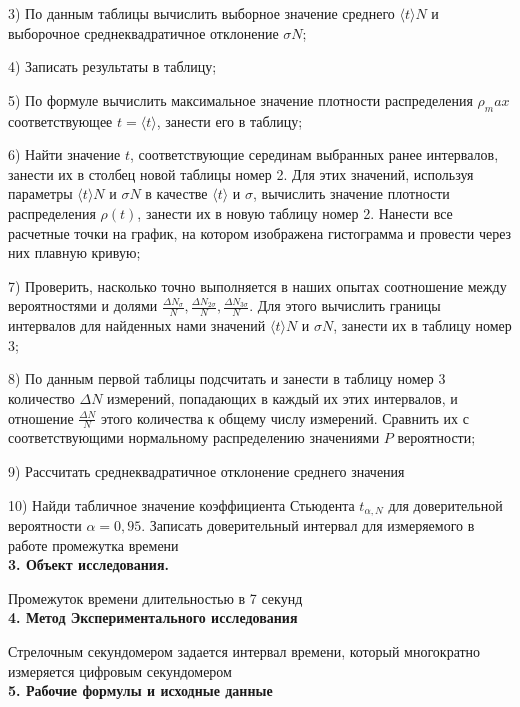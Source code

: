 \documentclass[14pt]{article}
\begin{document}
	\par 3) По данным таблицы вычислить выборное значение среднего $\langle t \rangle N$ и выборочное среднеквадратичное отклонение $\sigma N$;
	\par 4) Записать результаты в таблицу;
	\par 5) По формуле вычислить максимальное значение плотности распределения $\rho_max$ соответствующее $t=\langle t \rangle$, занести его в таблицу;
	\par 6) Найти значение $t$, соответствующие серединам выбранных ранее интервалов, занести их в столбец новой таблицы номер 2. Для этих значений, используя параметры $\langle t \rangle N$ и $\sigma N$ в качестве $\langle t \rangle$ и $\sigma$, вычислить значение плотности распределения $\rho (t)$, занести их в новую таблицу номер 2. Нанести все расчетные точки на график, на котором изображена гистограмма и провести через них плавную кривую;  
	\par 7) Проверить, насколько точно выполняется в наших опытах соотношение между вероятностями и долями $\frac{\Delta N_{\sigma}}{N},\frac{\Delta N_{2\sigma}}{N},\frac{\Delta N_{3\sigma}}{N}$. Для этого вычислить границы интервалов для найденных нами значений $\langle t \rangle N$ и $\sigma N$, занести их в таблицу номер 3; 
	\par 8) По данным первой таблицы подсчитать и занести в таблицу номер 3 количество $\Delta N$ измерений, попадающих в каждый их этих интервалов, и отношение $\frac{\Delta N}{N}$ этого количества к общему числу измерений. Сравнить их с соответствующими нормальному распределению значениями $P$ вероятности; 
	\par 9) Рассчитать среднеквадратичное отклонение среднего значения 
	\par 10) Найди табличное значение коэффициента Стьюдента $t_{\alpha,N}$ для доверительной вероятности $\alpha=0,95$. Записать доверительный интервал для измеряемого в работе промежутка времени \\
	\textbf{3. Объект исследования.} 
	\par Промежуток времени длительностью в 7 секунд \\
	\textbf{4. Метод Экспериментального исследования} 
	\par Стрелочным секундомером задается интервал времени, который многократно измеряется цифровым секундомером \\
	\textbf{5. Рабочие формулы и исходные данные} \\
\end{document}
